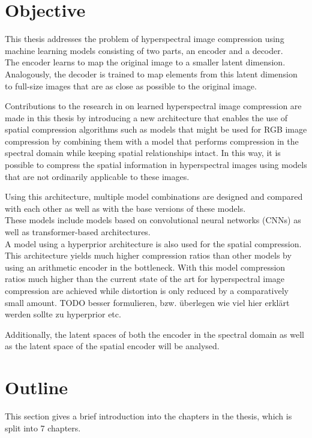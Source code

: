 \section{Objective\label{sec:objective}}
This thesis addresses the problem of hyperspectral image compression using machine learning models consisting of two parts, an encoder and a decoder.\\
The encoder learns to map the original image to a smaller latent dimension. Analogously, the decoder is trained to map elements from this latent dimension to full-size images that are as close as possible to the original image.

Contributions to the research in on learned hyperspectral image compression are made in this thesis by introducing a new architecture that enables the use of spatial compression algorithms such as models that might be used for RGB image compression by combining them with a model that performs compression in the spectral domain while keeping spatial relationships intact. In this way, it is possible to compress the spatial information in hyperspectral images using models that are not ordinarily applicable to these images.

Using this architecture, multiple model combinations are designed and compared with each other as well as with the base versions of these models.\\
These models include models based on convolutional neural networks (CNNs) as well as transformer-based architectures.\\
A model using a hyperprior architecture is also used for the spatial compression. This architecture yields much higher compression ratios than other models by using an arithmetic encoder in the bottleneck. With this model compression ratios much higher than the current state of the art for hyperspectral image compression are achieved while distortion is only reduced by a comparatively small amount. TODO besser formulieren, bzw. überlegen wie viel hier erklärt werden sollte zu hyperprior etc.

Additionally, the latent spaces of both the encoder in the spectral domain as well as the latent space of the spatial encoder will be analysed.

\section{Outline\label{sec:outline}}
This section gives a brief introduction into the chapters in the thesis, which is split into 7 chapters.


